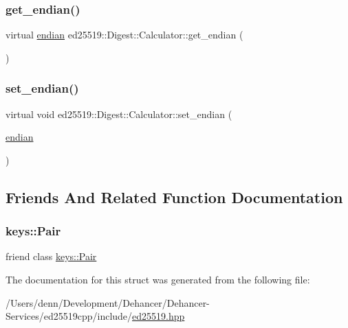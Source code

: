 \subsubsection{\texorpdfstring{get\_endian()}{get\_endian()}}
{\footnotesize\ttfamily virtual \mbox{\hyperlink{structed25519_1_1_digest_1_1_calculator_a9bbea874787f93cdf4841b30c1c0d9a3}{endian}} ed25519\+::\+Digest\+::\+Calculator\+::get\+\_\+endian (\begin{DoxyParamCaption}{ }\end{DoxyParamCaption})\hspace{0.3cm}{\ttfamily [pure virtual]}}

\mbox{\label{structed25519_1_1_digest_1_1_calculator_a2e5de160d53feaef2ce5c0240e8e13ea}} 
\subsubsection{\texorpdfstring{set\_endian()}{set\_endian()}}
{\footnotesize\ttfamily virtual void ed25519\+::\+Digest\+::\+Calculator\+::set\+\_\+endian (\begin{DoxyParamCaption}\item[{\mbox{\hyperlink{structed25519_1_1_digest_1_1_calculator_a9bbea874787f93cdf4841b30c1c0d9a3}{endian}}}]{ }\end{DoxyParamCaption})\hspace{0.3cm}{\ttfamily [pure virtual]}}



\subsection{Friends And Related Function Documentation}
\mbox{\label{structed25519_1_1_digest_1_1_calculator_ad89670fe663c8c8526b69b1bc6a87c19}} 
\subsubsection{\texorpdfstring{keys::Pair}{keys::Pair}}
{\footnotesize\ttfamily friend class \mbox{\hyperlink{classed25519_1_1keys_1_1_pair}{keys\+::\+Pair}}\hspace{0.3cm}{\ttfamily [friend]}}



The documentation for this struct was generated from the following file\+:\begin{DoxyCompactItemize}
\item 
/\+Users/denn/\+Development/\+Dehancer/\+Dehancer-\/\+Services/ed25519cpp/include/\mbox{\hyperlink{ed25519_8hpp}{ed25519.\+hpp}}\end{DoxyCompactItemize}
